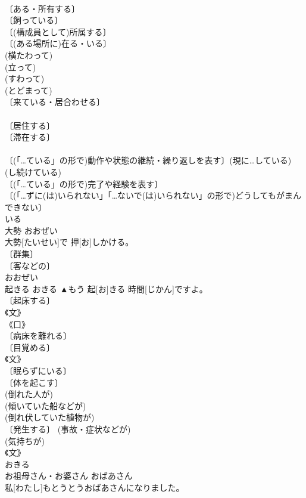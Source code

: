 \documentclass[8pt]{extreport}
\begin{document}
\begin{CJK}{UTF8}{min}
\\	〔ある・所有する〕 
\\	〔飼っている〕 
\\	〔(構成員として)所属する〕 
\\	〔(ある場所に)在る・いる〕 
\\	(横たわって) 
\\	(立って) 
\\	(すわって) 
\\	(とどまって) 
\\	〔来ている・居合わせる〕 
\\	[⇒いつづける, いにくい] 
\\	〔居住する〕 
\\	〔滞在する〕 
\\	[⇒いつづける] 
\\	〔(「…ている」の形で)動作や状態の継続・繰り返しを表す〕(現に…している) 
\\	(し続けている) 
\\	〔(「…ている」の形で)完了や経験を表す〕 
\\	〔(「…ずに(は)いられない」「…ないで(は)いられない」の形で)どうしてもがまんできない〕 
\\	いる	
\\	大勢	おおぜい	
\\	大勢[たいせい]で 押[お]しかける。	
\\	〔群集〕 
\\	〔客などの〕 
\\	おおぜい	
\\	起きる	おきる	▲もう 起[お]きる 時間[じかん]ですよ。	
\\	〔起床する〕 
\\	《文》 
\\	《口》 
\\	〔病床を離れる〕 
\\	〔目覚める〕 
\\	《文》 
\\	〔眠らずにいる〕 
\\	〔体を起こす〕 
\\	(倒れた人が) 
\\	(傾いていた船などが) 
\\	(倒れ伏していた植物が) 
\\	〔発生する〕 (事故・症状などが) 
\\	(気持ちが) 
\\	《文》 
\\	おきる	
\\	お祖母さん・お婆さん	おばあさん	
\\	私[わたし]もとうとうおばあさんになりました。	

\end{CJK}
\end{document}
